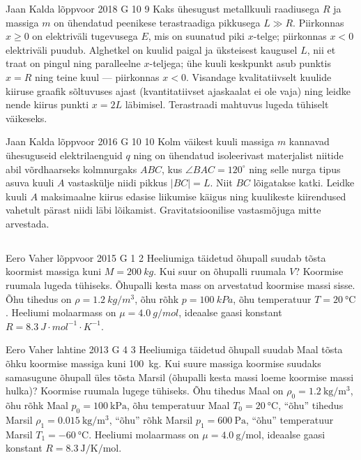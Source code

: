 \documentclass[11pt]{article}
\begin{document}
{%
{Jaan Kalda} %
{lõppvoor} %
{2018} %
{G 10} %
{9} %
{
\ifStatement
Kaks ühesugust metallkuuli raadiusega $R$ ja massiga $m$ on ühendatud peenikese terastraadiga pikkusega $L\gg R$. Piirkonnas $x\ge 0$ on elektriväli tugevusega $E$, mis on suunatud piki $x$-telge; piirkonnas $x< 0$ elektriväli puudub. Alghetkel on kuulid paigal ja üksteisest kaugusel $L$, nii et traat on pingul ning paralleelne $x$-teljega; ühe kuuli keskpunkt asub punktis $x=R$ ning teine kuul --- piirkonnas $x<0$. Visandage kvalitatiivselt kuulide kiiruse graafik sõltuvuses ajast (kvantitatiivset ajaskaalat ei ole vaja) ning leidke nende kiirus punkti $x=2L$ läbimisel. Terastraadi mahtuvus lugeda tühiselt väikeseks.
\fi
}

{Jaan Kalda} %
{lõppvoor} %
{2016} %
{G 10} %
{10} %
{
\ifStatement
Kolm väikest kuuli massiga $m$ kannavad ühesuguseid elektrilaenguid $q$ ning on ühendatud isoleerivast materjalist niitide abil võrdhaarseks kolmnurgaks $ABC$, kus $\angle BAC=120^\circ$ ning selle nurga tipus asuva kuuli $A$ vastaskülje niidi pikkus $|BC|=L$. Niit $BC$ lõigatakse katki. Leidke \osa kuuli $A$ maksimaalne kiirus edasise liikumise käigus ning \osa kuulikeste kiirendused vahetult pärast niidi läbi lõikamist. Gravitatsioonilise vastasmõjuga mitte arvestada.
\fi
}
\newpage\subsection{\protect{}}

{Eero Vaher} %
{lõppvoor} %
{2015} %
{G 1} %
{2} %
{
\ifStatement
Heeliumiga täidetud õhupall suudab tõsta koormist massiga kuni $M=\SI{200}{kg}$. Kui suur on õhupalli ruumala $V$? Koormise ruumala lugeda tühiseks. Õhupalli kesta mass on arvestatud koormise massi sisse. Õhu tihedus on $\rho=\SI{1.2}{kg\per m^3}$, õhu rõhk $p=\SI{100}{kPa}$, õhu temperatuur $T=\SI{20}{\celsius}$. Heeliumi molaarmass on $\mu=\SI{4.0}{g\per mol}$, ideaalse gaasi konstant $R=\SI{8.3}{J\cdot mol^{-1}\cdot K^{-1}}$.
\fi
}

{Eero Vaher} %
{lahtine} %
{2013} %
{G 4} %
{3} %
{
\ifStatement
Heeliumiga täidetud õhupall suudab Maal tõsta õhku koormise massiga kuni
\SI{100}{\kilogram}. Kui suure massiga koormise suudaks samasugune õhupall
üles tõsta Marsil (õhupalli kesta massi loeme koormise massi hulka)? 
Koormise ruumala lugege tühiseks. Õhu tihedus Maal on
$\rho_0=\SI{1.2}{\kilogram\per\meter^3}$, õhu rõhk Maal
$p_0=\SI{100}{\kilo\pascal}$, õhu temperatuur Maal $T_0=\SI{20}{\celsius}$,
\enquote{õhu} tihedus Marsil $\rho_1=\SI{0.015}{\kilogram\per\meter^3}$, \enquote{õhu} rõhk Marsil
$p_1=\SI{600}{\pascal}$, \enquote{õhu} temperatuur Marsil $T_1=\SI{-60}{\celsius}$.
Heeliumi molaarmass on $\mu=\SI{4.0}{\gram\per\mole}$, ideaalse gaasi konstant
$R=\SI{8.3}{\joule\per\kelvin\per\mole}$.
\fi
}

}
\end{document}
